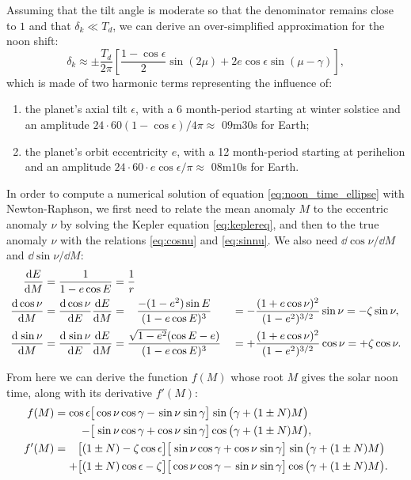 \documentclass[12pt]{article}
\newcommand{\Sin}{%
  \mathop{\sbox0{$\cos$}\makebox[\wd0][r]{$\sin$}}%
}
\begin{document}
Assuming that the tilt angle is moderate so that the denominator remains 
close to $1$ and that $\delta_k\ll T_d$, we can derive an 
over-simplified approximation for the noon shift:
\begin{equation}
    \delta_k \approx \pm\frac{T_d}{2\pi} \left[
        \frac{1-\cos\epsilon}{2} \sin(2\mu) + 2e \cos\epsilon \sin(\mu-\gamma)
    \right],
\end{equation}
which is made of two harmonic terms representing the influence of:
\begin{enumerate}
    \item the planet's axial tilt $\epsilon$, with a 6 month-period starting 
    at winter solstice and an amplitude $24\cdot 60 (1-\cos \epsilon) / 4\pi
    \approx$ $09$m$30$s for Earth;
    \item the planet's orbit eccentricity $e$, with a 12 month-period starting
    at perihelion and an amplitude $24\cdot 60 \cdot e \cos \epsilon / \pi
    \approx$ $08$m$10$s for Earth.
\end{enumerate}

In order to compute a numerical solution of equation 
\eqref{eq:noon_time_ellipse} with Newton-Raphson, we first need to relate 
the mean anomaly $M$ to the eccentric anomaly $\nu$ by solving the Kepler 
equation \eqref{eq:keplereq}, and then to the true anomaly $\nu$ with the 
relations \eqref{eq:cosnu} and \eqref{eq:sinnu}.
We also need $\dd \cos \nu / \dd M$ and $\dd \sin\nu / \dd M$:
\begin{alignat}{2}
    \dv{E}{M} &= \frac{1}{1-e\cos E} = \frac{1}{r} &&\\
    \dv{\cos \nu}{M} &= \dv{\cos \nu}{E} \dv{E}{M} = \;\;\;\frac{-(1-e^2)\sin E}{(1-e\cos E)^3} &&= -\frac{(1+e\cos \nu)^2}{(1-e^2)^{3/2}} \sin \nu = -\zeta \sin \nu,\\
    \dv{\Sin \nu}{M} &= \dv{\Sin \nu}{E} \dv{E}{M} = \frac{\sqrt{1-e^2}(\cos E - e)}{(1-e\cos E)^3} &&= +\frac{(1+e\cos \nu)^2}{(1-e^2)^{3/2}} \cos \nu = +\zeta \cos \nu.
\end{alignat}

From here we can derive the function $f(M)$ whose root $M$ gives the solar noon 
time, along with its derivative $f'(M)$:
\begin{align}
    f(M) &= 
    \begin{aligned}[t]
        \cos\epsilon &\big[
            \cos\nu \cos\gamma - \Sin\nu \Sin\gamma
        \big] \Sin\big(\gamma + (1\pm N)M\big)\\
        - &\big[
            \Sin\nu \cos\gamma + \cos\nu \Sin\gamma
        \big] \cos\big(\gamma + (1\pm N)M\big),
    \end{aligned}\\
    f'(M) &= 
    \begin{aligned}[t]
        &\big[(1 \pm N) - \zeta \cos \epsilon\big] 
        \big[\Sin \nu \cos \gamma + \cos \nu \Sin \gamma\big]
        \Sin\big(\gamma + (1\pm N)M\big)\\
        +&\big[(1 \pm N)\cos \epsilon - \zeta\big] 
        \big[\cos \nu \cos \gamma - \Sin \nu \Sin \gamma\big]
        \cos\big(\gamma + (1\pm N)M\big).
    \end{aligned}
\end{align}
\end{document}
